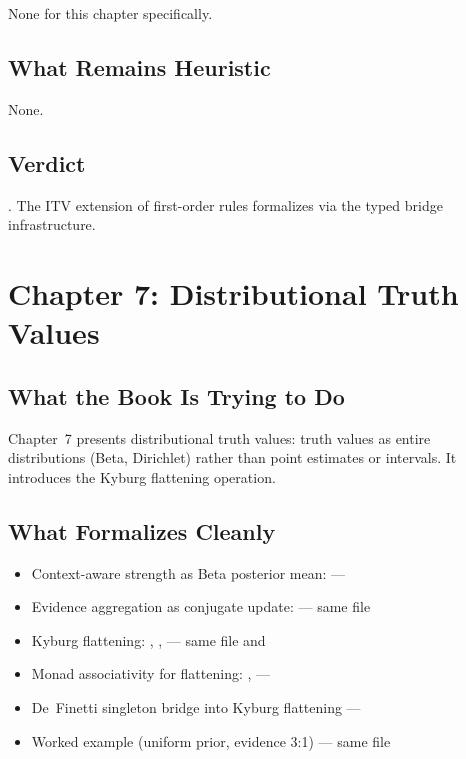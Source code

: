 \documentclass[11pt,openany]{report}
\begin{document}
None for this chapter specifically.

\section{What Remains Heuristic}

None.

\section{Verdict}

\verdictClean{}.  The ITV extension of first-order rules formalizes
via the typed bridge infrastructure.


\chapter{Chapter 7: Distributional Truth Values}
\label{ch:review-ch7}

\section{What the Book Is Trying to Do}

Chapter~7 presents distributional truth values: truth values as entire
distributions (Beta, Dirichlet) rather than point estimates or intervals.
It introduces the Kyburg flattening operation.

\section{What Formalizes Cleanly}

\begin{itemize}
\item Context-aware strength as Beta posterior mean:
   ---
\item Evidence aggregation as conjugate update:
   --- same file
\item Kyburg flattening: ,
  ,  ---
  same file and 
\item Monad associativity for flattening:
  ,  ---
\item De~Finetti singleton bridge into Kyburg flattening ---
\item Worked example (uniform prior, evidence 3:1) ---
  same file
\end{itemize}
\end{document}
